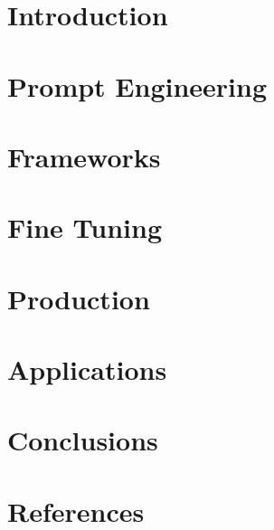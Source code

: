 \section[Intro]{Introduction}






\section[Prompts]{Prompt Engineering}


\section[Frameworks]{Frameworks}








\section[OwnData]{Fine Tuning}



\section[Prod]{Production}


\section[Apps]{Applications}


\section[Concl]{Conclusions}





\section[Refs]{References}



